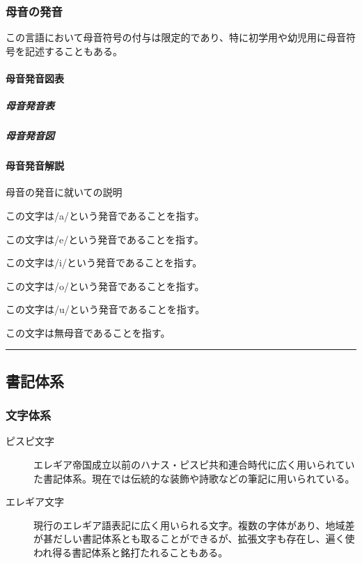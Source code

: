 \documentclass[
  japanese,
]{article}
\providecommand{\tightlist}{%
  \setlength{\itemsep}{0pt}\setlength{\parskip}{0pt}}
\begin{document}
\subsubsection{母音の発音}\label{section2.2}

この言語において母音符号の付与は限定的であり、特に初学用や幼児用に母音符号を記述することもある。

\paragraph{母音発音図表}\label{subsection2.2.1}

\subparagraph{母音発音表}\label{subsubsection2.2.1.1}

\subparagraph{母音発音図}\label{subsubsection2.2.1.2}

\paragraph{母音発音解説}\label{subsection2.2.2}

母音の発音に就いての説明

\begin{description}
\tightlist
\item[{◌a}]
この文字は{/a/}という発音であることを指す。
\item[{◌e}]
この文字は{/e/}という発音であることを指す。
\item[{◌i}]
この文字は{/i/}という発音であることを指す。
\item[{◌o}]
この文字は{/o/}という発音であることを指す。
\item[{◌u}]
この文字は{/u/}という発音であることを指す。
\item[{◌w}]
この文字は無母音であることを指す。
\end{description}

\begin{center}\rule{0.5\linewidth}{0.5pt}\end{center}

\subsection{書記体系}\label{chapter3}

\subsubsection{文字体系}\label{section3.1}

\begin{description}
\item[ピスピ文字]
エレギア帝国成立以前のハナス・ピスピ共和連合時代に広く用いられていた書記体系。現在では伝統的な装飾や詩歌などの筆記に用いられている。
\item[エレギア文字]
現行のエレギア語表記に広く用いられる文字。複数の字体があり、地域差が甚だしい書記体系とも取ることができるが、拡張文字も存在し、遍く使われ得る書記体系と銘打たれることもある。
\end{description}
\end{document}
